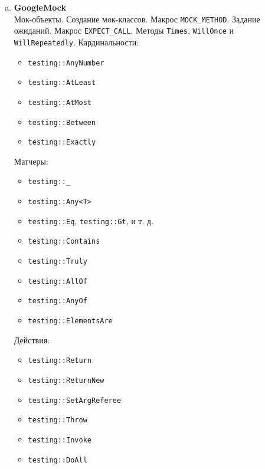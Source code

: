 \documentclass{article}
\begin{document}
\begin{enumerate}
\begin{enumerate}[a.]
\item \textbf{GoogleMock}\\
Мок-объекты. Создание мок-классов. Макрос \texttt{MOCK\_METHOD}. Задание ожиданий. Макрос \texttt{EXPECT\_CALL}. Методы \texttt{Times}, \texttt{WillOnce} и \texttt{WillRepeatedly}.
Кардинальности:
\begin{itemize}
\item \texttt{testing::AnyNumber}
\item \texttt{testing::AtLeast}
\item \texttt{testing::AtMost}
\item \texttt{testing::Between}
\item \texttt{testing::Exactly}
\end{itemize}

Матчеры:
\begin{multicols}{2}
\begin{itemize}
\item \texttt{testing::\_}
\item \texttt{testing::Any<T>}
\item \texttt{testing::Eq}, \texttt{testing::Gt}, и т. д.
\item \texttt{testing::Contains}
\item \texttt{testing::Truly}
\item \texttt{testing::AllOf}
\item \texttt{testing::AnyOf}
\item \texttt{testing::ElementsAre}
\end{itemize}
\end{multicols}

Действия:
\begin{multicols}{2}
\begin{itemize}
\item \texttt{testing::Return}
\item \texttt{testing::ReturnNew}
\item \texttt{testing::SetArgReferee}
\item \texttt{testing::Throw}
\item \texttt{testing::Invoke}
\item \texttt{testing::DoAll}
\end{itemize}
\end{multicols}

\end{enumerate}




\end{enumerate}
\end{document}
